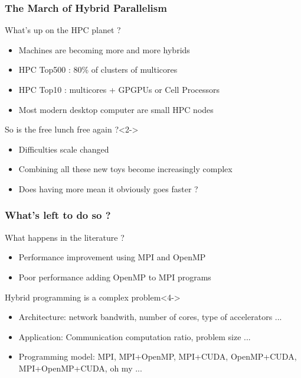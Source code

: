 \frame
{
  \frametitle{The March of Hybrid Parallelism}
  \begin{block}{What's up on the HPC planet ?}
  \begin{itemize}
  \footnotesize
   \item Machines are becoming more and more hybrids
   \item HPC Top500 : 80\% of clusters of multicores
   \item HPC Top10 : multicores + GPGPUs or Cell Processors
   \item Most modern desktop computer are small HPC nodes
   \end{itemize}
  \end{block}{}

  \begin{block}{So is the free lunch free again ?}<2->
  \begin{itemize}
  \footnotesize
   \item Difficulties scale changed
   \item Combining all these new toys become increasingly complex
   \item Does having more mean it obviously goes faster ?
   \end{itemize}
  \end{block}{}
}

\frame
{
  \frametitle{What's left to do so ?}
  \begin{block}{What happens in the literature ?}
  \begin{itemize}
  \footnotesize
   \item<2-> Performance improvement using MPI and OpenMP\\
   \item<3-> Poor performance adding OpenMP to MPI programs \\
   \end{itemize}
  \end{block}{}

  \begin{block}{Hybrid programming is a complex problem}<4->
   \begin{itemize}
   \footnotesize
   \item Architecture: network bandwith, number of cores, type of accelerators ...\\
   \item Application: Communication computation ratio, problem size ... \\
   \item Programming model: MPI, MPI+OpenMP, MPI+CUDA, OpenMP+CUDA, MPI+OpenMP+CUDA, oh my ... \\
   \end{itemize}
  \end{block}{}
}


